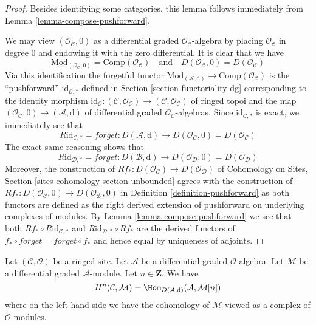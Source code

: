\begin{proof}
Besides identifying some categories, this lemma follows immediately
from Lemma \ref{lemma-compose-pushforward}.

\medskip\noindent
We may view $(\mathcal{O}_\mathcal{C}, 0)$ as a differential graded
$\mathcal{O}_\mathcal{C}$-algebra by placing $\mathcal{O}_\mathcal{C}$
in degree $0$ and endowing it with the zero differential. It is clear
that we have
$$
\text{Mod}_{(\mathcal{O}_\mathcal{C}, 0)} =
\text{Comp}(\mathcal{O}_\mathcal{C})
\quad\text{and}\quad
D(\mathcal{O}_\mathcal{C}, 0) = D(\mathcal{O}_\mathcal{C})
$$
Via this identification the forgetful functor
$\text{Mod}_{(\mathcal{A}, \text{d})} \to
\text{Comp}(\mathcal{O}_\mathcal{C})$
is the ``pushforward'' $\text{id}_{\mathcal{C}, *}$
defined in Section \ref{section-functoriality-dg}
corresponding to the identity morphism
$\text{id}_\mathcal{C} : (\mathcal{C}, \mathcal{O}_\mathcal{C}) \to
(\mathcal{C}, \mathcal{O}_\mathcal{C})$ of ringed topoi and the
map $(\mathcal{O}_\mathcal{C}, 0) \to (\mathcal{A}, \text{d})$
of differential graded $\mathcal{O}_\mathcal{C}$-algebras.
Since $\text{id}_{\mathcal{C}, *}$ is exact, we immediately see that
$$
R\text{id}_{\mathcal{C}, *} = forget :
D(\mathcal{A}, \text{d}) \longrightarrow
D(\mathcal{O}_\mathcal{C}, 0) = D(\mathcal{O}_\mathcal{C})
$$
The exact same reasoning shows that
$$
R\text{id}_{\mathcal{D}, *} = forget :
D(\mathcal{B}, \text{d}) \longrightarrow
D(\mathcal{O}_\mathcal{D}, 0) = D(\mathcal{O}_\mathcal{D})
$$
Moreover, the construction of
$Rf_* : D(\mathcal{O}_\mathcal{C}) \to D(\mathcal{O}_\mathcal{D})$
of Cohomology on Sites, Section \ref{sites-cohomology-section-unbounded}
agrees with the construction of
$Rf_* : D(\mathcal{O}_\mathcal{C}, 0) \to D(\mathcal{O}_\mathcal{D}, 0)$
in Definition \ref{definition-pushforward}
as both functors are defined as the right derived extension of
pushforward on underlying complexes of modules.
By Lemma \ref{lemma-compose-pushforward} we see that both
$Rf_* \circ R\text{id}_{\mathcal{C}, *}$ and
$R\text{id}_{\mathcal{D}, *} \circ Rf_*$ are the derived functors
of $f_* \circ forget = forget \circ f_*$ and hence equal
by uniqueness of adjoints.
\end{proof}

\begin{lemma}
\label{lemma-cohomology-ext}
Let $(\mathcal{C}, \mathcal{O})$ be a ringed site.
Let $\mathcal{A}$ be a differential graded $\mathcal{O}$-algebra.
Let $\mathcal{M}$ be a differential graded $\mathcal{A}$-module.
Let $n \in \mathbf{Z}$. We have
$$
H^n(\mathcal{C}, \mathcal{M}) =
\Hom_{D(\mathcal{A}, \text{d})}(\mathcal{A}, \mathcal{M}[n])
$$
where on the left hand side we have the cohomology of $\mathcal{M}$
viewed as a complex of $\mathcal{O}$-modules.
\end{lemma}

